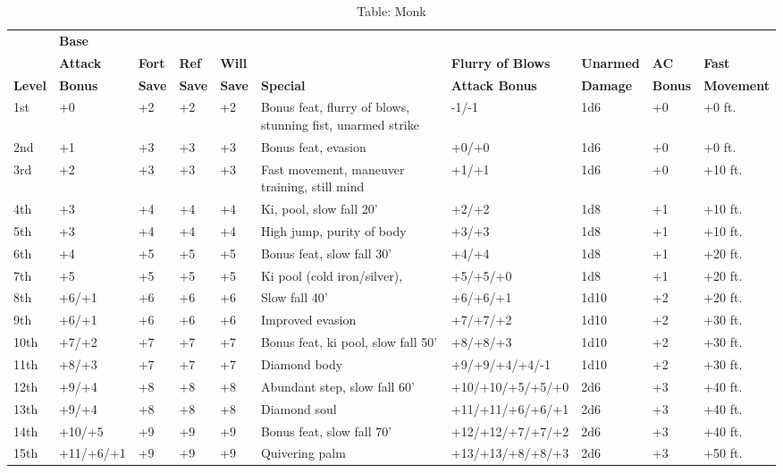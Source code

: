 \begin{table*}[]
\sffamily
\setlength{\tabcolsep}{1pt}
\caption{Table: Monk}
\begin{tabularx}{\linewidth}{lllllXllll}
      & \textbf{Base}   &      &      &      &         &                 &         &       & \\
      & \textbf{Attack} & \textbf{Fort} & \textbf{Ref}  & \textbf{Will} &         & \textbf{Flurry of Blows} & \textbf{Unarmed} & \textbf{AC}    & \textbf{Fast}\\
\textbf{Level} & \textbf{Bonus}  & \textbf{Save} & \textbf{Save} & \textbf{Save} & \textbf{Special} &  \textbf{Attack Bonus}   &  \textbf{Damage} & \textbf{Bonus} & \textbf{Movement}\\
\hline
1st & +0 & +2 & +2 & +2 & Bonus feat, flurry of blows, stunning fist, unarmed strike & -1/-1 & 1d6 & +0 & +0 ft.\\
2nd & +1 & +3 & +3 & +3 & Bonus feat, evasion & +0/+0 & 1d6 & +0 & +0 ft.\\
3rd & +2 & +3 & +3 & +3 & Fast movement, maneuver training, still mind & +1/+1 & 1d6 & +0 & +10 ft.\\
4th & +3 & +4 & +4 & +4 & Ki,  pool, slow fall 20' & +2/+2 & 1d8 & +1 & +10 ft.\\
5th & +3 & +4 & +4 & +4 & High jump, purity of body & +3/+3 & 1d8 & +1 & +10 ft.\\
6th & +4 & +5 & +5 & +5 & Bonus feat, slow fall 30' & +4/+4 & 1d8 & +1 & +20 ft.\\
7th & +5 & +5 & +5 & +5 & Ki pool (cold iron/silver),  & +5/+5/+0 & 1d8 & +1 & +20 ft.\\
8th & +6/+1 & +6 & +6 & +6 & Slow fall 40' & +6/+6/+1 & 1d10 & +2 & +20 ft.\\
9th & +6/+1 & +6 & +6 & +6 & Improved evasion & +7/+7/+2 & 1d10 & +2 & +30 ft.\\
10th & +7/+2 & +7 & +7 & +7 & Bonus feat, ki pool, slow fall 50' & +8/+8/+3 & 1d10 & +2 & +30 ft.\\
11th & +8/+3 & +7 & +7 & +7 & Diamond body & +9/+9/+4/+4/-1 & 1d10 & +2 & +30 ft.\\
12th & +9/+4 & +8 & +8 & +8 & Abundant step, slow fall 60' & +10/+10/+5/+5/+0 & 2d6 & +3 & +40 ft.\\
13th & +9/+4 & +8 & +8 & +8 & Diamond soul & +11/+11/+6/+6/+1 & 2d6 & +3 & +40 ft.\\
14th & +10/+5 & +9 & +9 & +9 & Bonus feat, slow fall 70' & +12/+12/+7/+7/+2 & 2d6 & +3 & +40 ft.\\
15th & +11/+6/+1 & +9 & +9 & +9 & Quivering palm & +13/+13/+8/+8/+3 & 2d6 & +3 & +50 ft.\\

\end{tabularx}
\end{table*}

